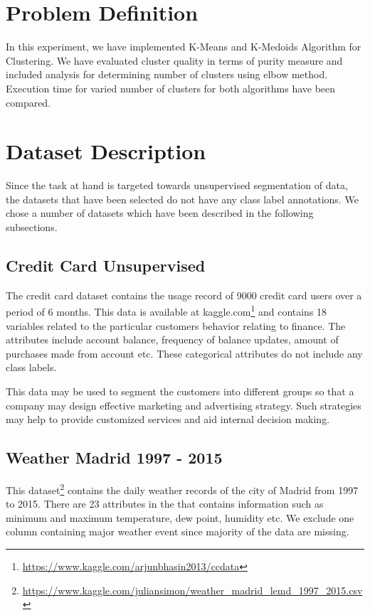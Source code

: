 \documentclass[12pt]{article}
\begin{document}
\maketitle
\thispagestyle{empty}
\clearpage
\newpage

\section{Problem Definition}
In this experiment, we have implemented K-Means and K-Medoids Algorithm for Clustering. We have evaluated cluster quality in terms of purity measure and included analysis for determining number of clusters using elbow method. Execution time for varied number of clusters for both algorithms have been compared.

\section{Dataset Description}
Since the task at hand is targeted towards unsupervised segmentation of data, the datasets that have been selected do not have any class label annotations. We chose a number of datasets which have been described in the following subsections.

\subsection{Credit Card Unsupervised}
\label{credit}
The credit card dataset contains the usage record of 9000 credit card users over a period of 6 months. This data is available at kaggle.com\footnote{\url{https://www.kaggle.com/arjunbhasin2013/ccdata}} and contains 18 variables related to the particular customers behavior relating to finance. The attributes include account balance, frequency of balance updates, amount of purchases made from account etc. These categorical attributes do not include any class labels.

This data may be used to segment the customers into different groups so that a company may design effective marketing and advertising strategy. Such strategies may help to provide customized services and aid internal decision making.

\subsection{Weather Madrid 1997 - 2015}
This dataset\footnote{\url{https://www.kaggle.com/juliansimon/weather_madrid_lemd_1997_2015.csv}} contains the daily weather records of the city of Madrid from 1997 to 2015. There are 23 attributes in the that contains information such as minimum and maximum temperature, dew point, humidity etc. We exclude one column containing major weather event since majority of the data are missing.
\end{document}
